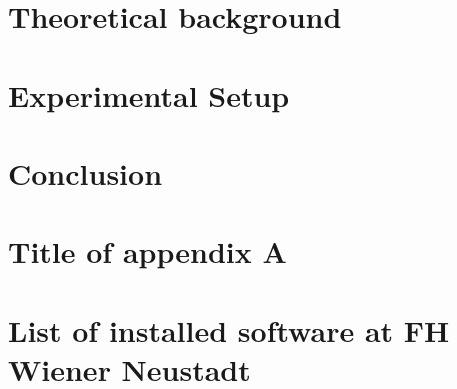 \documentclass[oneside,12pt,bibtotoc,]{report}
\begin{document}
\chapter{Theoretical background}
    

\chapter{Experimental Setup}
    

\chapter{Conclusion}
    
    
        
\printbibliography[title={References}]

\appendix
\chapter{Title of appendix A}


\chapter{List of installed software at FH Wiener Neustadt}

\end{document}
